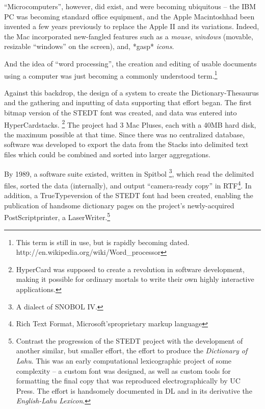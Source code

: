 ``Microcomputers'', however, did exist, and were becoming ubiquitous -- the IBM PC was becoming standard
office equipment, and the Apple Macintosh\texttrademark had been invented
a few years previously to replace the Apple II and its variations.  
Indeed, the Mac incorporated new-fangled features such
as a {\it mouse}, {\it windows} (movable, resizable ``windows'' on the
screen), and, *gasp* {\it icons}.

And the idea of ``word processing'', the creation and editing of usable
documents using a computer was just becoming a commonly understood
term.\footnote{This term is still in use, but is rapidly becoming
dated. http://en.wikipedia.org/wiki/Word\_processor}

Against this backdrop, the design of a system to create 
the Dictionary-Thesaurus and the gathering and inputting of data supporting
that effort began.  The first bitmap version of
the STEDT font was created, and data was entered into HyperCard\texttrademark stacks.
\footnote{HyperCard was supposed to create a revolution in software
  development, making it possible for ordinary mortals to write their
  own highly interactive applications.}  The project had 3 Mac Pluses\texttrademark, each with a 40MB hard
disk, the maximum possible at that time.  Since there was no
centralized database, software was developed to export the data from the Stacks
into delimited text files which could be combined and sorted into
larger aggregations.

By 1989, a software suite existed, written in Spitbol \footnote{A
  dialect of SNOBOL IV.}, which read the delimited files, sorted the
data (internally), and output ``camera-ready copy'' in
RTF\footnote{Rich Text Format, Microsoft's\texttrademark proprietary markup
  language}.   In addition, a TrueType\texttrademark version of the STEDT font
had been created, enabling the publication of handsome dictionary
pages on the project's newly-acquired PostScript\texttrademark printer, a
LaserWriter\texttrademark.\footnote{Contrast the progression of the
  STEDT project with the development of another similar, but smaller
  effort, the effort to produce the {\it Dictionary of Lahu}. This was
  an early computational lexicographic project of some complexity -- a custom
  font was designed, as well as custom tools for formatting the final
  copy that was reproduced electrographically by UC Press.  The effort
  is handsomely documented in DL and in its derivative the {\it English-Lahu Lexicon}.}

